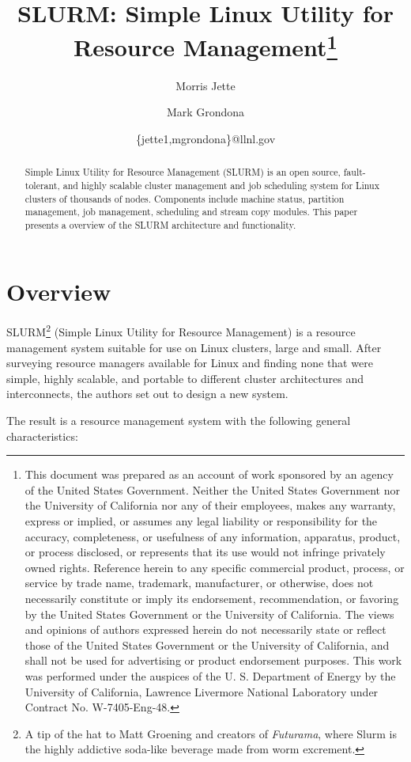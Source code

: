 \documentclass{article}
\title{SLURM: Simple Linux Utility for Resource Management\thanks{
This document was prepared as an account of work sponsored by an
agency of the United States Government.  Neither the United States
Government nor the University of California nor any of their
employees, makes any warranty, express or implied, or assumes any
legal liability or responsibility for the accuracy, completeness, or
usefulness of any information, apparatus, product, or process
disclosed, or represents that its use would not infringe privately
owned rights. Reference herein to any specific commercial product,
process, or service by trade name, trademark, manufacturer, or
otherwise, does not necessarily constitute or imply its endorsement,
recommendation, or favoring by the United States Government or the
University of California.  The views and opinions of authors expressed
herein do not necessarily state or reflect those of the United States
Government or the University of California, and shall not be used for
advertising or product endorsement purposes.
This work was performed under the auspices of the U. S. Department of
Energy by the University of California, Lawrence Livermore National
Laboratory under Contract No. W-7405-Eng-48.}}
\author{Morris Jette \and Mark Grondona}
\date{\{jette1,mgrondona\}@llnl.gov}
\begin{document}
\maketitle

\begin{abstract}
Simple Linux Utility for Resource Management (SLURM) is an open source,
fault-tolerant, and highly scalable cluster management and job 
scheduling system for Linux clusters of thousands of nodes.  Components 
include machine status, partition management, job management, scheduling 
and stream copy modules.  This paper presents a overview of the SLURM architecture and functionality.
\end{abstract}

\section{Overview}

SLURM\footnote{A tip of the hat to Matt Groening and creators of {\em Futurama},
where Slurm is the highly addictive soda-like beverage made from worm
excrement.} (Simple Linux Utility for Resource Management) 
is a resource management 
system suitable for use on Linux clusters, large and small.  After 
surveying\cite{Jette2002} resource managers available for Linux and finding 
none that were simple, highly scalable, and portable to different cluster 
architectures and interconnects, the authors set out to design a new system.

The result is a resource management system with the following general
characteristics:
\end{document}
